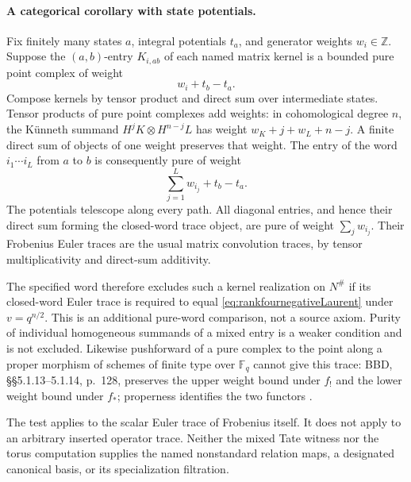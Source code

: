 \paragraph{A categorical corollary with state potentials.}
Fix finitely many states \(a\), integral potentials \(t_a\),
and generator weights \(w_i\in\mathbb Z\).
Suppose the \((a,b)\)-entry \(K_{i,ab}\) of each named
matrix kernel is a bounded pure point complex of weight
\begin{equation}\label{eq:purekernelstatepotential}
                            w_i+t_b-t_a.
\end{equation}
Compose kernels by tensor product and direct sum over
intermediate states. Tensor products of pure point
complexes add weights: in cohomological degree \(n\),
the K\"unneth summand \(H^jK\otimes H^{n-j}L\)
has weight \(w_K+j+w_L+n-j\).
A finite direct sum of objects of one weight preserves
that weight.
The entry of the word \(i_1\cdots i_L\) from \(a\) to
\(b\) is consequently pure of weight
\[
                        \sum_{j=1}^Lw_{i_j}+t_b-t_a.
\]
The potentials telescope along every path. All diagonal
entries, and hence their direct sum forming the closed-word
trace object, are pure of weight \(\sum_jw_{i_j}\).
Their Frobenius Euler traces are the usual matrix
convolution traces, by tensor multiplicativity and
direct-sum additivity.

The specified  word therefore excludes such a
kernel realization on \(N^\#\) if its closed-word Euler
trace is required to equal
\eqref{eq:rankfournegativeLaurent} under
\(v=q^{n/2}\).
This is an additional pure-word comparison, not a source
axiom. Purity of individual homogeneous summands of a
mixed entry is a weaker condition and is not excluded.
Likewise pushforward of a pure complex to the point along
a proper morphism of schemes of finite type over
\(\mathbb F_q\) cannot give this trace: BBD,
\S\S5.1.13--5.1.14, p.~128, preserves the upper weight
bound under \(f_!\) and the lower weight bound under
\(f_*\); properness identifies the two functors
\cite{BBD}.

The test applies to the scalar Euler trace of Frobenius
itself. It does not apply to an arbitrary inserted
operator trace. Neither the mixed Tate witness nor the
torus computation supplies the named nonstandard relation
maps, a designated canonical basis, or its specialization
filtration.

